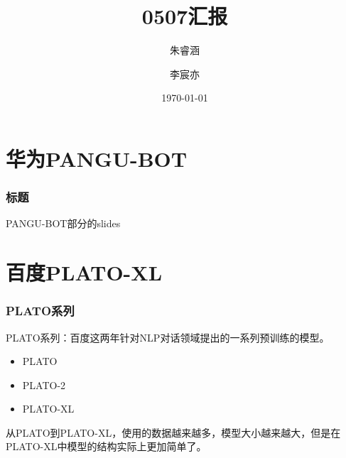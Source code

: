 \documentclass{beamer}
\title{0507汇报}
\author{朱睿涵 \and 李宸亦}
\institute{项目三}
\date{\today}
\begin{document}
\frame{\titlepage} %


\section{华为PANGU-BOT}
\begin{frame}
    \frametitle{标题}

    PANGU-BOT部分的slides

\end{frame}

\section{百度PLATO-XL}
\begin{frame}
    \frametitle{PLATO系列}

    PLATO系列：百度这两年针对NLP对话领域提出的一系列预训练的模型。

    \begin{itemize}
        \item PLATO
        \item PLATO-2
        \item PLATO-XL
    \end{itemize}

    从PLATO到PLATO-XL，使用的数据越来越多，模型大小越来越大，但是在PLATO-XL中模型的结构实际上更加简单了。
\end{frame}
\end{document}
